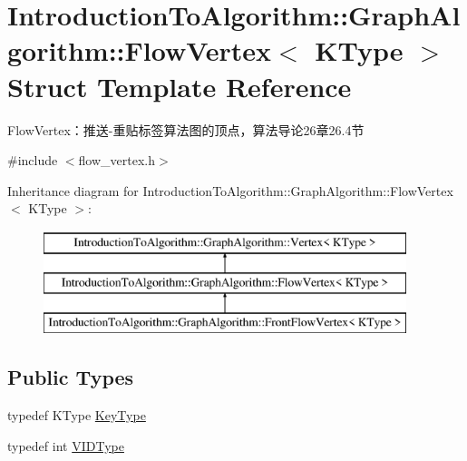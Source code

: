 \hypertarget{struct_introduction_to_algorithm_1_1_graph_algorithm_1_1_flow_vertex}{}\section{Introduction\+To\+Algorithm\+:\+:Graph\+Algorithm\+:\+:Flow\+Vertex$<$ K\+Type $>$ Struct Template Reference}
\label{struct_introduction_to_algorithm_1_1_graph_algorithm_1_1_flow_vertex}


Flow\+Vertex：推送-\/重贴标签算法图的顶点，算法导论26章26.4节  




{\ttfamily \#include $<$flow\+\_\+vertex.\+h$>$}

Inheritance diagram for Introduction\+To\+Algorithm\+:\+:Graph\+Algorithm\+:\+:Flow\+Vertex$<$ K\+Type $>$\+:\begin{figure}[H]
\begin{center}
\leavevmode
\includegraphics[height=3.000000cm]{struct_introduction_to_algorithm_1_1_graph_algorithm_1_1_flow_vertex}
\end{center}
\end{figure}
\subsection*{Public Types}
\begin{DoxyCompactItemize}
\item 
typedef K\+Type \hyperlink{struct_introduction_to_algorithm_1_1_graph_algorithm_1_1_flow_vertex_a014b25c20124a24525ef7db0588466b9}{Key\+Type}
\item 
typedef int \hyperlink{struct_introduction_to_algorithm_1_1_graph_algorithm_1_1_flow_vertex_ae48ab0918590bd6a6763d007694ff161}{V\+I\+D\+Type}
\end{DoxyCompactItemize}
